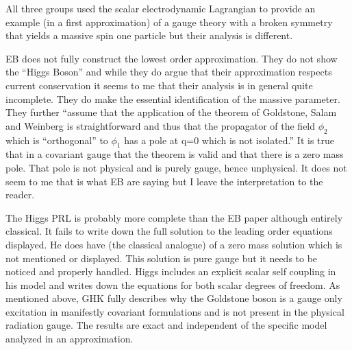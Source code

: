 \documentclass[preprintnumbers,12pt]{revtex4-2}
\begin{document}
All three groups used the scalar electrodynamic Lagrangian to provide
an example (in a first approximation) of a gauge theory with a
broken symmetry that yields a massive spin one particle but their
analysis is different.

EB does not fully construct the lowest order approximation. They do
not show the ``Higgs Boson'' and while they do argue that their
approximation respects current conservation it seems to me that their
analysis is in general quite incomplete. They do make the essential
identification of the massive parameter. They further ``assume that
the application of the theorem of Goldstone, Salam and Weinberg is
straightforward and thus that the propagator of the field $\phi_2$ which
is ``orthogonal'' to $\phi_1$ has a pole at q=0 which is not isolated.''
It is true that in a covariant gauge that the theorem is valid and
that there is a zero mass pole. That pole is not physical and is
purely gauge, hence unphysical. It does not seem to me that
is what EB are saying but I leave the interpretation to the reader.

The Higgs PRL is probably more complete than the EB paper
although entirely classical. It  fails to write down the full
solution to the leading order equations displayed. He does have (the classical analogue) of a zero mass
solution which is not mentioned or displayed. This solution is pure gauge but it needs to be noticed and
properly handled. Higgs includes an explicit scalar
self coupling in his model and writes down the equations for both scalar
degrees of freedom. As mentioned above, GHK fully describes why the Goldstone boson is a gauge only
excitation in manifestly covariant formulations and is not present in
the physical radiation gauge. The results are exact and independent of the specific model
analyzed in an approximation.
\end{document}
